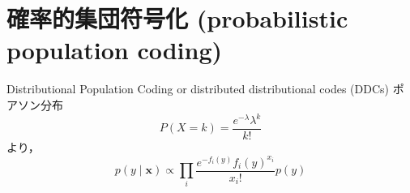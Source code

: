 \section{確率的集団符号化 (probabilistic population coding)}
Distributional Population Coding or distributed distributional codes (DDCs)
ポアソン分布
\begin{equation}
P(X=k)={\frac  {e^{-\lambda} \lambda^k}{k!}}
\end{equation}
より，
\begin{equation}
p(y \mid \mathbf{x}) \propto \prod_{i} \frac{e^{-f_{i}(y)} f_{i}(y)^{x_{i}}}{x_{i} !} p(y)
\end{equation}
